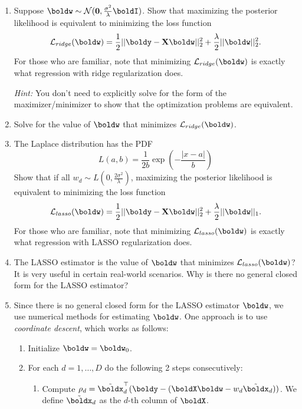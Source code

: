 \documentclass[submit]{../harvardml}
\begin{document}
\begin{problem}
    \begin{enumerate}
        \item Suppose $\boldw \sim \mathcal{N}(\mathbf{0},\frac{\sigma^2}{\lambda}\boldI)$. Show that maximizing the posterior likelihood is equivalent to minimizing the loss function
        \[\mathcal{L}_{ridge}(\boldw) = \frac{1}{2}||\boldy -\bold X\boldw||_2^2 + \frac{\lambda}{2}||\boldw||_2^2.\]
        For those who are familiar, note that minimizing $\mathcal{L}_{ridge}(\boldw)$ is exactly what regression with ridge regularization does.

        \textit{Hint:} You don't need to explicitly solve for the form of the maximizer/minimizer to show that the optimization problems are equivalent.

        \item Solve for the value of $\boldw$ that minimizes $\mathcal L_{ridge}(\boldw)$.

        \item The Laplace distribution has the PDF
       \[L(a,b) =\frac{1}{2b} \exp\left(-\frac{|x - a|}{b}\right)\]
        Show that if all $w_d \sim L\left(0,\frac{2\sigma^2}{\lambda}\right)$, maximizing the posterior likelihood is equivalent to minimizing the loss function
        \[\mathcal{L}_{lasso}(\boldw) = \frac{1}{2}||\boldy -\bold X\boldw||_2^2  + \frac{\lambda}{2}||\boldw||_1.\]
        For those who are familiar, note that minimizing $\mathcal{L}_{lasso}(\boldw)$ is exactly what regression with LASSO regularization does.

        \item The LASSO estimator is the value of $\boldw$ that minimizes $\mathcal{L}_{lasso}(\boldw)$? It is very useful in certain real-world scenarios. Why is there no general closed form for the LASSO estimator?

        \item Since there is no general closed form for the LASSO estimator $\boldw$, we use numerical methods for estimating $\boldw$. One approach is to use \textit{coordinate descent}, which works as follows:
        \begin{enumerate}
            \item Initialize $\boldw=\boldw_0$.
            \item For each $d=1, \ldots, D$ do the following 2 steps consecutively:
            \begin{enumerate}
                \item Compute $\rho_d = \tilde{\boldx}_d^\top(\boldy - (\boldX \boldw - w_d \tilde{\boldx}_d))$. We define $\tilde{\boldx}_d$ as the $d$-th column of $\boldX$.


\end{enumerate}
\end{enumerate}
\end{enumerate}
\end{problem}
\end{document}

